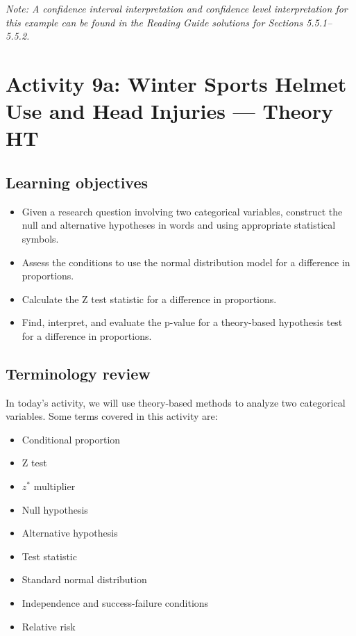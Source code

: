 \documentclass[
]{report}
\begin{document}
\emph{Note: A confidence interval interpretation and confidence level interpretation for this example can be found in the Reading Guide solutions for Sections 5.5.1--5.5.2.}

\newpage

\hypertarget{activity-9a-winter-sports-helmet-use-and-head-injuries-theory-ht}{%
\section{Activity 9a: Winter Sports Helmet Use and Head Injuries --- Theory HT}\label{activity-9a-winter-sports-helmet-use-and-head-injuries-theory-ht}}


\hypertarget{learning-objectives-13}{%
\subsection{Learning objectives}\label{learning-objectives-13}}

\begin{itemize}
\item
  Given a research question involving two categorical variables, construct the null and alternative hypotheses
  in words and using appropriate statistical symbols.
\item
  Assess the conditions to use the normal distribution model for a difference in proportions.
\item
  Calculate the Z test statistic for a difference in proportions.
\item
  Find, interpret, and evaluate the p-value for a theory-based hypothesis test for a difference in proportions.
\end{itemize}

\hypertarget{terminology-review-14}{%
\subsection{Terminology review}\label{terminology-review-14}}

In today's activity, we will use theory-based methods to analyze two categorical variables. Some terms covered in this activity are:

\begin{itemize}
\item
  Conditional proportion
\item
  Z test
\item
  \(z^*\) multiplier
\item
  Null hypothesis
\item
  Alternative hypothesis
\item
  Test statistic
\item
  Standard normal distribution
\item
  Independence and success-failure conditions
\item
  Relative risk
\end{itemize}
\end{document}

